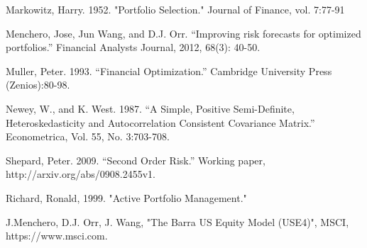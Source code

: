 \documentclass[10pt]{article}
\begin{document}
\newpage
\begin{thebibliography}{1}
	 Markowitz, Harry. 1952. "Portfolio Selection." 
	Journal of Finance, vol. 7:77-91
	
	 Menchero, Jose, Jun Wang, and D.J. Orr. 
	“Improving risk forecasts for optimized portfolios.” 
	Financial Analysts Journal, 2012, 68(3): 40-50.

	 Muller, Peter. 1993. “Financial Optimization.” 
	Cambridge University Press (Zenios):80-98.

	 Newey, W., and K. West. 1987. “A Simple, Positive Semi-Definite, 
	Heteroskedasticity and Autocorrelation Consistent Covariance Matrix.” 
	Econometrica, Vol. 55, No. 3:703-708.
	
	 Shepard, Peter. 2009. “Second Order Risk.” 
	Working paper, http://arxiv.org/abs/0908.2455v1.
	
	 Richard, Ronald, 1999. "Active Portfolio Management."
	
	 J.Menchero, D.J. Orr, J. Wang, "The Barra US Equity Model (USE4)", MSCI, https://www.msci.com. 

	\end{thebibliography}
\end{document}
